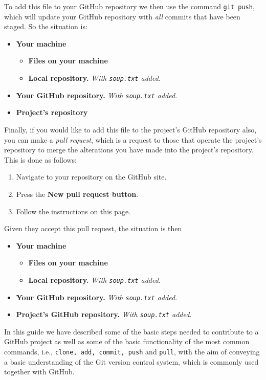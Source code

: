 \documentclass[11pt]{amsart}
\def\code#1{\texttt{#1}}
\begin{document}
To add this file to your GitHub repository we then use the command \code{git push}, which will update your GitHub repository with \emph{all} commits that have been staged. So the situation is:
\begin{itemize}
    \item \textbf{Your machine}
    \begin{itemize}
        \item \textbf{Files on your machine}
        \item \textbf{Local repository.} \emph{With \code{soup.txt} added.}
    \end{itemize}
    \item \textbf{Your GitHub repository.} \emph{With \code{soup.txt} added.}
    \item \textbf{Project's repository}
\end{itemize}
    
Finally, if you would like to add this file to the project's GitHub repository also, you can make a \emph{pull request}, which is a request  to those that operate the project's repository to merge the alterations you have made into the project's repository. This is done as follows: 
\begin{enumerate}
    \item Navigate to your repository on the GitHub site. 
    \item Press the \textbf{New pull request button}.
    \item Follow the instructions on this page.
\end{enumerate}

Given they accept this pull request, the situation is then
\begin{itemize}
    \item \textbf{Your machine}
    \begin{itemize}
        \item \textbf{Files on your machine}
        \item \textbf{Local repository.} \emph{With \code{soup.txt} added.}
    \end{itemize}
    \item \textbf{Your GitHub repository.} \emph{With \code{soup.txt} added.}
    \item \textbf{Project's GitHub repository.} \emph{With \code{soup.txt} added.}
\end{itemize}

In this guide we have described some of the basic steps needed to contribute to a GitHub project as well as some of the basic functionality of the most common commands, i.e., \code{clone, add, commit, push} and \code{pull}, with the aim of conveying a basic understanding of the Git version control system, which is commonly used together with GitHub. 
\end{document}
